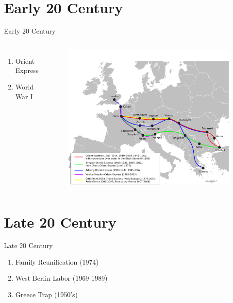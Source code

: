 \documentclass{beamer}
\begin{document}
\section{Early 20 Century}
\begin{frame}{Early 20 Century}
	\begin{columns}
			\begin{enumerate}
				\item Orient Express
				\item World War I
			\end{enumerate}
			\vspace{-0.2\textheight}
			\begin{figure}[ht]
				\centering
				\includegraphics[width=1.1\textwidth]{oxpress.png}
			\end{figure}
	\end{columns}
\end{frame}

\section{Late 20 Century}
\begin{frame}{Late 20 Century}
	\begin{enumerate}
		\item Family Reunification (1974)
		\item West Berlin Labor (1969-1989)
		\item Greece Trap (1950's)
	\end{enumerate}
\end{frame}
\end{document}
